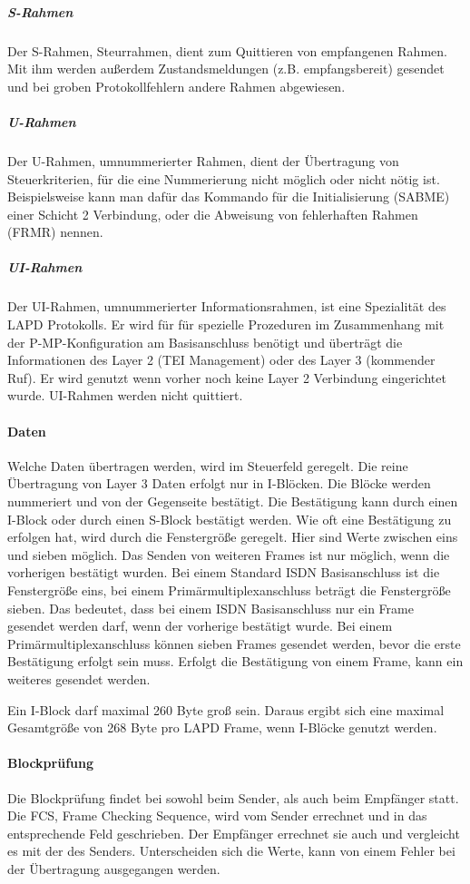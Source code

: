 \documentclass[12pt, a4paper, ngerman]{article}
\newcommand{\fcs}{FCS, Frame Checking Sequence,\xspace}
\begin{document}
\subparagraph{S-Rahmen}
Der S-Rahmen, Steurrahmen, dient zum Quittieren von empfangenen Rahmen. Mit ihm werden außerdem Zustandsmeldungen (z.B. empfangsbereit) gesendet und bei groben Protokollfehlern andere Rahmen abgewiesen.

\subparagraph{U-Rahmen}
Der U-Rahmen, umnummerierter Rahmen, dient der Übertragung von Steuerkriterien, für die eine Nummerierung nicht möglich oder nicht nötig ist. Beispielsweise kann man dafür das Kommando für die Initialisierung (SABME) einer Schicht 2 Verbindung, oder die Abweisung von fehlerhaften Rahmen (FRMR) nennen.

\subparagraph{UI-Rahmen}
Der UI-Rahmen, umnummerierter Informationsrahmen, ist eine Spezialität des LAPD Protokolls. Er wird für für spezielle Prozeduren im Zusammenhang mit der P-MP-Konfiguration am Basisanschluss benötigt und überträgt die Informationen des Layer 2 (TEI Management) oder des Layer 3 (kommender Ruf). Er wird genutzt wenn vorher noch keine Layer 2 Verbindung eingerichtet wurde. UI-Rahmen werden nicht quittiert.

\paragraph{Daten}
Welche Daten übertragen werden, wird im Steuerfeld geregelt. Die reine Übertragung von Layer 3 Daten erfolgt nur in I-Blöcken. Die Blöcke werden nummeriert und von der Gegenseite bestätigt. Die Bestätigung kann durch einen I-Block oder durch einen S-Block bestätigt werden. Wie oft eine Bestätigung zu erfolgen hat, wird durch die Fenstergröße geregelt. Hier sind Werte zwischen eins und sieben möglich. Das Senden von weiteren Frames ist nur möglich, wenn die vorherigen bestätigt wurden. Bei einem Standard ISDN Basisanschluss ist die Fenstergröße eins, bei einem Primärmultiplexanschluss beträgt die Fenstergröße sieben. Das bedeutet, dass bei einem ISDN Basisanschluss nur ein Frame gesendet werden darf, wenn der vorherige bestätigt wurde. Bei einem Primärmultiplexanschluss können sieben Frames gesendet werden, bevor die erste Bestätigung erfolgt sein muss. Erfolgt die Bestätigung von einem Frame, kann ein weiteres gesendet werden.

Ein I-Block darf maximal 260 Byte groß sein. Daraus ergibt sich eine maximal Gesamtgröße von 268 Byte pro LAPD Frame, wenn I-Blöcke genutzt werden.

\paragraph{Blockprüfung}
Die Blockprüfung findet bei sowohl beim Sender, als auch beim Empfänger statt. Die \fcs wird vom Sender errechnet und in das entsprechende Feld geschrieben. Der Empfänger errechnet sie auch und vergleicht es mit der des Senders. Unterscheiden sich die Werte, kann von einem Fehler bei der Übertragung ausgegangen werden.  
 
\end{document}

